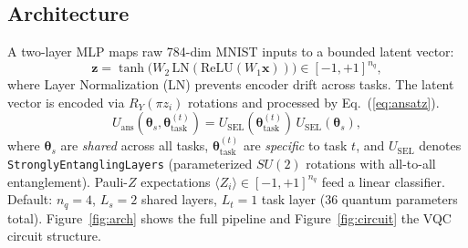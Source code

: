 \documentclass{llncs}
\begin{document}
\subsection{Architecture}
\label{subsec:arch}

A two-layer MLP maps raw 784-dim MNIST inputs to a bounded latent vector:
\[
  \mathbf{z} = \tanh\!\bigl(W_2\,\mathrm{LN}(\mathrm{ReLU}(W_1\mathbf{x}))\bigr)
  \in [-1,+1]^{n_q},
\]
where Layer Normalization (LN) prevents encoder drift across tasks.
The latent vector is encoded via $R_Y(\pi z_i)$ rotations and processed by Eq.~(\ref{eq:ansatz}).
\begin{equation}
  U_\mathrm{ans}(\boldsymbol\theta_s, \boldsymbol\theta_\mathrm{task}^{(t)}) =
  U_\mathrm{SEL}(\boldsymbol\theta_\mathrm{task}^{(t)})\,
  U_\mathrm{SEL}(\boldsymbol\theta_s),
  \label{eq:ansatz}
\end{equation}
where $\boldsymbol\theta_s$ are \emph{shared} across all tasks,
$\boldsymbol\theta_\mathrm{task}^{(t)}$ are \emph{specific} to task $t$, and
$U_\mathrm{SEL}$ denotes \texttt{StronglyEntanglingLayers} (parameterized
$SU(2)$ rotations with all-to-all entanglement).
Pauli-$Z$ expectations $\langle Z_i\rangle\in[-1,+1]^{n_q}$ feed a linear
classifier.
Default: $n_q=4$, $L_s=2$ shared layers, $L_t=1$ task layer (36 quantum
parameters total).
Figure~\ref{fig:arch} shows the full pipeline and Figure~\ref{fig:circuit}
the VQC circuit structure.
\end{document}
